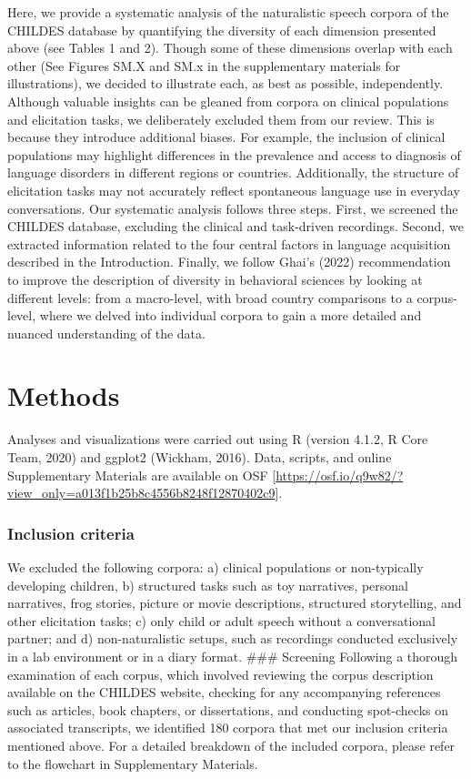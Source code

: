 \documentclass[
  man,floatsintext]{apa6}
\begin{document}
Here, we provide a systematic analysis of the naturalistic speech corpora of the CHILDES database by quantifying the diversity of each dimension presented above (see Tables 1 and 2). Though some of these dimensions overlap with each other (See Figures SM.X and SM.x in the supplementary materials for illustrations), we decided to illustrate each, as best as possible, independently.
Although valuable insights can be gleaned from corpora on clinical populations and elicitation tasks, we deliberately excluded them from our review. This is because they introduce additional biases. For example, the inclusion of clinical populations may highlight differences in the prevalence and access to diagnosis of language disorders in different regions or countries. Additionally, the structure of elicitation tasks may not accurately reflect spontaneous language use in everyday conversations.
Our systematic analysis follows three steps. First, we screened the CHILDES database, excluding the clinical and task-driven recordings. Second, we extracted information related to the four central factors in language acquisition described in the Introduction. Finally, we follow Ghai's (2022) recommendation to improve the description of diversity in behavioral sciences by looking at different levels: from a macro-level, with broad country comparisons to a corpus-level, where we delved into individual corpora to gain a more detailed and nuanced understanding of the data.

\section{Methods}\label{methods}

Analyses and visualizations were carried out using R (version 4.1.2, R Core Team, 2020) and ggplot2 (Wickham, 2016). Data, scripts, and online Supplementary Materials are available on OSF {[}\url{https://osf.io/q9w82/?view_only=a013f1b25b8c4556b8248f12870402c9}{]}.

\subsubsection{Inclusion criteria}\label{inclusion-criteria}

We excluded the following corpora: a) clinical populations or non-typically developing children, b) structured tasks such as toy narratives, personal narratives, frog stories, picture or movie descriptions, structured storytelling, and other elicitation tasks; c) only child or adult speech without a conversational partner; and d) non-naturalistic setups, such as recordings conducted exclusively in a lab environment or in a diary format.
\#\#\# Screening
Following a thorough examination of each corpus, which involved reviewing the corpus description available on the CHILDES website, checking for any accompanying references such as articles, book chapters, or dissertations, and conducting spot-checks on associated transcripts, we identified 180 corpora that met our inclusion criteria mentioned above. For a detailed breakdown of the included corpora, please refer to the flowchart in Supplementary Materials.
\end{document}

